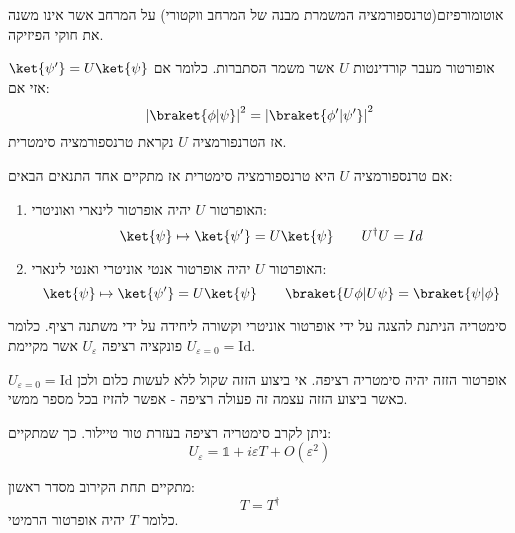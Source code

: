 \documentclass{tstextbook}
\begin{document}
\begin{definition}[סימטריה]
אוטומורפיזם(טרנספורמציה המשמרת מבנה של המרחב ווקטורי) על המרחב אשר אינו משנה את חוקי הפיזיקה.

\end{definition}
\begin{proposition}
אופורטור מעבר קורדינטות \(U\) אשר משמר הסתברות. כלומר אם \(\ket{\psi'}=U\ket{\psi}\) אזי אם:
$$\left\lvert  \braket{ \phi | \psi }   \right\rvert ^{2}= \left\lvert  \braket{ \phi' | \psi' }   \right\rvert ^{2}$$
אז הטרנפורמציה \(U\) נקראת טרנספורמציה סימטרית.

\end{proposition}
\begin{theorem}[ווגנר]
אם טרנספורמציה \(U\) היא טרנספורמציה סימטרית אז מתקיים אחד התנאים הבאים:

  \begin{enumerate}
    \item האופרטור \(U\) יהיה אופרטור לינארי ואוניטרי: 
$$\ket{\psi} \mapsto \ket{\psi'} =U\ket{\psi} \qquad U^{\dagger} U = Id $$


    \item האופרטור \(U\) יהיה אופרטור אנטי אוניטרי ואנטי לינארי: 
$$\ket{\psi} \mapsto \ket{\psi'} =U\ket{\psi} \qquad \braket{ U\phi | U\psi } =\braket{ \psi | \phi } $$


  \end{enumerate}
\end{theorem}
\begin{definition}
סימטריה הניתנת להצגה על ידי אופרטור אוניטרי וקשורה ליחידה על ידי משתנה רציף. כלומר פונקציה רציפה \(U_{\varepsilon}\) אשר מקיימת \(U_{\varepsilon=0}=\mathrm{Id}\).

\end{definition}
\begin{example}
אופרטור הזזה יהיה סימטריה רציפה. אי ביצוע הזזה שקול ללא לעשות כלום ולכן \(U_{\varepsilon=0}=\mathrm{Id}\) כאשר ביצוע הזזה עצמה זה פעולה רציפה - אפשר להזיז בכל מספר ממשי.

\end{example}
\begin{proposition}
ניתן לקרב סימטריה רציפה בעזרת טור טיילור. כך שמתקיים:
$$U_{\varepsilon}= \mathbb{ 1} +i\varepsilon T+O\left( \varepsilon^{2} \right)$$

\end{proposition}
\begin{corollary}
מתקיים תחת הקירוב מסדר ראשון:
$$T=T^{\dagger}$$
כלומר \(T\) יהיה אופרטור הרמיטי.

\end{corollary}
\end{document}
